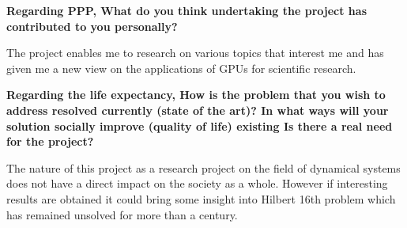 \noindent\textbf{Regarding PPP, What do you think undertaking the project has
contributed to you personally?}

The project enables me to research on various topics that interest me and has
given me a new view on the applications of GPUs for scientific research.

\noindent\textbf{Regarding the life expectancy, How is the problem that you wish
to address resolved currently (state of the art)? In what ways will your
solution socially improve (quality of life) existing Is there a real need for
the project?}

The nature of this project as a research project on the field of dynamical
systems does not have a direct impact on the society as a whole. However if
interesting results are obtained it could bring some insight into Hilbert 16th
problem which has remained unsolved for more than a century.
